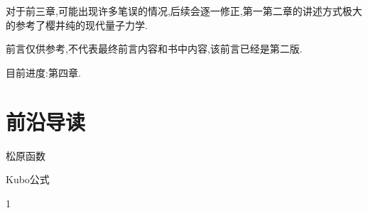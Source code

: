 \documentclass[lang=cn,newtx,10pt,scheme=chinese,thmcnt=section]{elegantbook}
\begin{document}
对于前三章,可能出现许多笔误的情况,后续会逐一修正,第一第二章的讲述方式极大的参考了樱井纯的现代量子力学.

前言仅供参考,不代表最终前言内容和书中内容,该前言已经是第二版.



目前进度:第四章.
















\chapter{前沿导读}
\begin{introduction}
	\item 松原函数
	\item Kubo公式
\end{introduction}
1
























\nocite{*}

\printbibliography[heading=bibintoc, title=\ebibname]
\appendix

\end{document}
